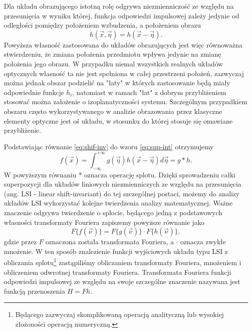 Dla układu obrazującego istotną rolę odgrywa niezmienniczość ze względu na przesunięcia w wyniku której, funkcja odpowiedzi impulsowej zależy jedynie od odległości pomiędzy położeniem wzbudzenia, a położeniem obrazu
\begin{equation}
h(\vec{x},\vec{\eta})=h(\vec{x}-\vec{\eta}).
\label{eq:shif-inv}
\end{equation}
Powyższa własność zastosowana do układów obrazujących jest więc równoważna stwierdzeniu, że zmiana położenia przedmiotu wpływa jedynie na zmianę położenia jego obrazu. W przypadku niemal wszystkich realnych układów optycznych własność ta nie jest spełniona w całej przestrzeni położeń, zazwyczaj można jednak obszar podzielić na "łaty" w których zastosowanie będą miały odpowiednie funkcje $h_i$, natomiast w ramach "łat" z dobrym przybliżeniem stosować można założenie o izoplanatyczności systemu. Szczególnym przypadkiem obszaru często wykorzystywanego w analizie obrazowania przez klasyczne elementy optyczne jest oś układu, w stosunku do której stosuje się omawiane przybliżenie.

Podstawiając równanie \ref{eq:shif-inv} do wzoru \ref{eq:sup-int} otrzymujemy
\begin{equation}
f(\vec{x})=\int_{-\infty}^{+\infty} g(\vec{\eta})  h(\vec{x}-\vec{\eta}) d \vec{\eta} = g \ast h.
\label{eq:splot}
\end{equation}
W powyższym równaniu $\ast$ oznacza operację splotu. Dzięki sprowadzeniu całki superpozycji dla układów liniowych niezmienniczych ze względu na przesunięcia (ang. LSI - linear shift-invariant) do tej szczególnej postaci, możemy do analizy układów LSI wykorzystać kolejne twierdzenia analizy matematycznej. Ważne znaczenie odgrywa twierdzenie o splocie, będącego jedną z podstawowych własności transformaty Fouriera zapiszemy powyższe równanie jako
\begin{equation}
F\{f(\vec{\nu})\} = F\{g(\vec{\nu})\} \cdot F\{h(\vec{\nu})\},
\label{eq:transfer-mult}
\end{equation}
gdzie przez $F$ oznaczona została transformata Fouriera, a $\cdot$ oznacza zwykłe mnożenie. W ten sposób znalezienie funkcji wyjściowych układu typu LSI z obliczania splotu\footnote{Będącego zazwyczaj skomplikowaną operacją analityczną lub wysokiej złożoności operacją numeryczną.} zastąpiliśmy obliczaniem transformaty Fouriera, mnożeniem i obliczeniem odwrotnej transformaty Fouriera. Transformata Fouriera funkcji odpowiedzi impulsowej ze względu na swoje szczególne znaczenie nazywana jest funkcją przenoszenia $H=F{h}$.

